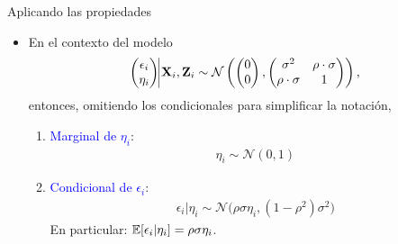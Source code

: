 \documentclass[10pt, xcolor=dvipsnames]{beamer}
\begin{document}
\begin{frame}{Aplicando las propiedades}
\begin{itemize}
	\item En el contexto del modelo
\begin{align*}
    \begin{pmatrix}
        \epsilon_i \\
        \eta_i\\
    \end{pmatrix} 
        \vline \XB_i,\ZB_i
        \sim \mathcal{N}
        \left(
    \begin{pmatrix}
        0 \\
        0\\
    \end{pmatrix}, 
    \begin{pmatrix}
        \sigma^2 & \rho \cdot \sigma\\
        \rho \cdot \sigma & 1\\
    \end{pmatrix}
    \right), 
\end{align*}
    entonces, omitiendo los condicionales para simplificar la notación,
    \vspace{1em}
    \begin{enumerate}
            \item \textcolor{blue}{Marginal de $\eta_i$}:
    \begin{align*}
        \eta_i \sim \mathcal{N} \left(0,1\right)
    \end{align*}
    \item \textcolor{blue}{Condicional de $\epsilon_i$}:
    \begin{align*}
        \epsilon_i|\eta_i \sim \mathcal{N} \Big(\rho\sigma \eta_i, (1-\rho^2) \sigma^2\Big)
    \end{align*}
    En particular: $\operatorname{\mathbb{E}}[\epsilon_i|\eta_i] = \rho\sigma\eta_i$.
    \end{enumerate}
\end{itemize}
\end{frame}
\end{document}
